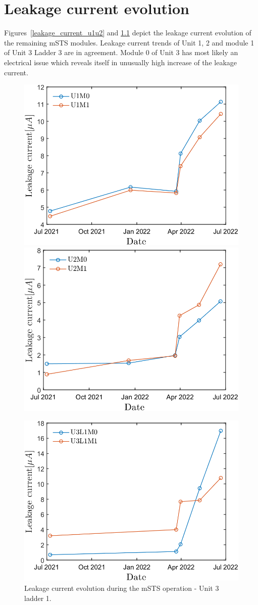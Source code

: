 \chapter{Leakage current evolution}
\label{Current}
Figures~\ref{leakage_current_u1u2} and \ref{leakage_current_u3l1} depict the leakage current evolution of the remaining \gls{mSTS} modules. Leakage current trends of Unit 1, 2 and module 1 of Unit 3 Ladder 3 are in agreement. Module 0 of Unit 3 has most likely an electrical issue which reveals itself in unusually high increase of the leakage current. 
\begin{figure}[h!]
\centering
\includegraphics[width=0.47\columnwidth]{Chapter6/DCS/images/sensors/U1_leakage.png}
\includegraphics[width=0.47\columnwidth]{Chapter6/DCS/images/sensors/U2_leakage.png}
\caption{Leakage current evolution during the \gls{mSTS} operation - Unit 1 and unit 2.}
\label{leakage_current_u1u2}
\includegraphics[width=0.5\columnwidth]{Chapter6/DCS/images/sensors/U3L1_leakage.png}
\caption{Leakage current evolution during the \gls{mSTS} operation - Unit 3 ladder 1.}
\label{leakage_current_u3l1}
\end{figure}



